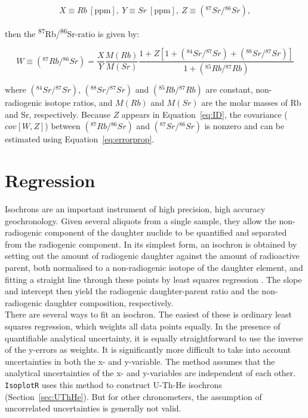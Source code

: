 \documentclass{article}
\begin{document}
\[
X \equiv Rb~[\text{ppm}]
,~Y \equiv Sr~[\text{ppm}]
,~Z \equiv ({}^{87}Sr/{}^{86}Sr),
\]

\noindent then the \textsuperscript{87}Rb/\textsuperscript{86}Sr-ratio
is given by:

\begin{equation}
  W \equiv \left({}^{87}Rb/{}^{86}Sr\right) = 
  \frac{X}{Y} \frac{M(Rb)}{M(Sr)}
  \frac{
    1+Z\left[1+({}^{84}Sr/{}^{87}Sr)+({}^{88}Sr/{}^{87}Sr) \right]
  }{
    1+({}^{85}Rb/{}^{87}Rb)
  }
  \label{eq:ID}
\end{equation}

\noindent where $({}^{84}Sr/{}^{87}Sr)$, $({}^{88}Sr/{}^{87}Sr)$ and
$({}^{85}Rb/{}^{87}Rb)$ are constant, non-radiogenic isotope ratios,
and $M(Rb)$ and $M(Sr)$ are the molar masses of Rb and Sr,
respectively. Because $Z$ appears in Equation~\ref{eq:ID}, the
covariance ($cov[W,Z]$) between $({}^{87}Rb/{}^{86}Sr)$ and
$({}^{87}Sr/{}^{86}Sr)$ is nonzero and can be estimated using
Equation~\ref{eq:errorprop}.

\section{Regression}
\label{sec:regression}

Isochrons are an important instrument of high precision, high accuracy
geochronology.  Given several aliquots from a single sample, they
allow the non-radiogenic component of the daughter nuclide to be
quantified and separated from the radiogenic component. In its
simplest form, an isochron is obtained by setting out the amount of
radiogenic daughter against the amount of radioactive parent, both
normalised to a non-radiogenic isotope of the daughter element, and
fitting a straight line through these points by least squares
regression \citep{nicolaysen1961}. The slope and intercept then yield
the radiogenic daughter-parent ratio and the non-radiogenic daughter
composition, respectively.\\

There are several ways to fit an isochron.  The easiest of these is
ordinary least squares regression, which weights all data points
equally. In the presence of quantifiable analytical uncertainty, it is
equally straightforward to use the inverse of the y-errors as weights.
It is significantly more difficult to take into account uncertainties
in both the x- and y-variable. The \citet{york1966} method assumes
that the analytical uncertainties of the x- and y-variables are
independent of each other. \texttt{IsoplotR} uses this method to
construct U-Th-He isochrons (Section~\ref{sec:UThHe}).  But for other
chronometers, the assumption of uncorrelated uncertainties is
generally not valid.\\
\end{document}
